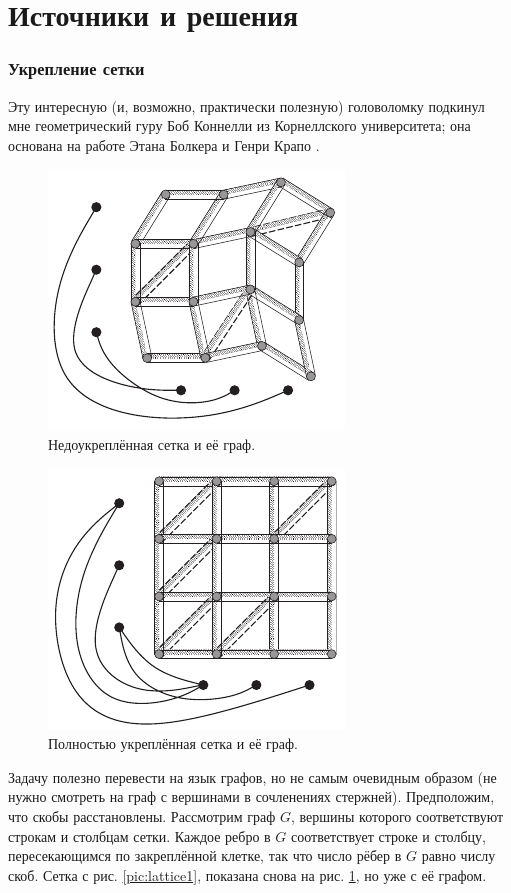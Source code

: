\section*{Источники и решения}

\subsubsection*{Укрепление сетки}

Эту интересную (и, возможно, практически полезную) головоломку подкинул мне геометрический гуру Боб Коннелли из Корнеллского университета; она основана на работе Этана Болкера и Генри Крапо \cite{8}.


\begin{figure}[ht!]
\centering
\includegraphics[scale=1]{pics/lattice2}
\caption{Недоукреплённая сетка и её граф.}
\label{pic:lattice2}
\end{figure}

\begin{figure}[t!]
\centering
\includegraphics[scale=1]{pics/lattice3}
\caption{Полностью укреплённая сетка и её граф.}
\label{pic:lattice3}
\end{figure}

Задачу полезно перевести на язык графов, но не самым очевидным образом (не нужно смотреть на граф с вершинами в сочленениях стержней).
Предположим, что скобы расстановлены.
Рассмотрим граф $G$, вершины которого соответствуют строкам и столбцам сетки.
Каждое ребро в $G$ соответствует строке и столбцу, пересекающимся по закреплённой клетке, так что число рёбер в $G$ равно числу скоб.
Сетка с рис. \ref{pic:lattice1}, показана снова на рис. \ref{pic:lattice2}, но уже с её графом.

